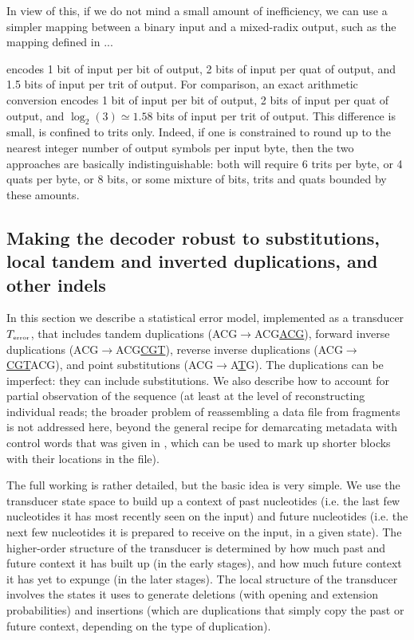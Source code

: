 \documentclass[english]{article}
\begin{document}
In view of this, if we do not mind a small amount of inefficiency,
we can use a simpler mapping between a binary input and a mixed-radix output,
such as the mapping defined in ...

encodes 1 bit of input per bit of output,
2 bits of input per quat of output,
and 1.5 bits of input per trit of output.
For comparison,
an exact arithmetic conversion
encodes 1 bit of input per bit of output,
2 bits of input per quat of output,
and $\log_2(3) \simeq 1.58$ bits of input per trit of output.
This difference is small, is confined to trits only.
Indeed, if one is constrained to round up to the nearest integer number of output symbols per input byte,
then the two approaches are basically indistinguishable:
both will require 6 trits per byte, or 4 quats per byte, or 8 bits,
or some mixture of bits, trits and quats bounded by these amounts.

\subsection{Making the decoder robust to substitutions, local tandem and inverted duplications, and other indels}

In this section we describe a statistical error model,
implemented as a transducer $T_{\mbox{\tiny error}}$,
that includes
tandem duplications (ACG$\to$ACG\underline{ACG}),
forward inverse duplications (ACG$\to$ACG\underline{CGT}),
reverse inverse duplications (ACG$\to$\underline{CGT}ACG),
and point substitutions (ACG$\to$A\underline{T}G).
The duplications can be imperfect: they can include substitutions.
We also describe how to account for partial observation of the sequence
(at least at the level of reconstructing individual reads;
the broader problem of reassembling a data file from fragments is not addressed here,
beyond the general recipe for demarcating metadata with control words
that was given in , which can be used to mark up shorter blocks
with their locations in the file).

The full working is rather detailed, but the basic idea is very simple.
We use the transducer state space to build up a context of past nucleotides
(i.e. the last few nucleotides it has most recently seen on the input)
and future nucleotides
(i.e. the next few nucleotides it is prepared to receive on the input, in a given state).
The higher-order structure of the transducer is determined by how much past and future context it has built up
(in the early stages),
and how much future context it has yet to expunge
(in the later stages).
The local structure of the transducer involves the states it uses to generate
deletions (with opening and extension probabilities)
and insertions (which are duplications that simply copy the past or future context,
depending on the type of duplication).
\end{document}
